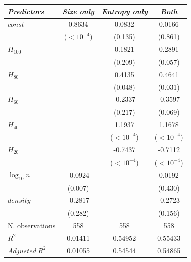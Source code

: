 \begin{tabular}{lccc}
\toprule
\textit{Predictors} & \textit{Size only} & \textit{Entropy only} & \textit{Both} \\
\midrule
$\mathit{const}$ & 0.8634 & 0.0832 & 0.0166 \\
 & {\scriptsize ($<10^{-4}$)} & {\scriptsize (0.135)} & {\scriptsize (0.861)} \\
$H_{100}$ &  & 0.1821 & 0.2891 \\
 &  & {\scriptsize (0.209)} & {\scriptsize (0.057)} \\
$H_{80}$ &  & 0.4135 & 0.4641 \\
 &  & {\scriptsize (0.048)} & {\scriptsize (0.031)} \\
$H_{60}$ &  & -0.2337 & -0.3597 \\
 &  & {\scriptsize (0.217)} & {\scriptsize (0.069)} \\
$H_{40}$ &  & 1.1937 & 1.1678 \\
 &  & {\scriptsize ($<10^{-4}$)} & {\scriptsize ($<10^{-4}$)} \\
$H_{20}$ &  & -0.7437 & -0.7112 \\
 &  & {\scriptsize ($<10^{-4}$)} & {\scriptsize ($<10^{-4}$)} \\
$\log_{10} n$ & -0.0924 &  & 0.0192 \\
 & {\scriptsize (0.007)} &  & {\scriptsize (0.430)} \\
$\mathit{density}$ & -0.2817 &  & -0.2723 \\
 & {\scriptsize (0.282)} &  & {\scriptsize (0.156)} \\
\midrule
N. observations & 558 & 558 & 558 \\
$R^2$ & 0.01411 & 0.54952 & 0.55433 \\
$\mathit{Adjusted}~R^2$ & 0.01055 & 0.54544 & 0.54865 \\
\bottomrule
\end{tabular}
